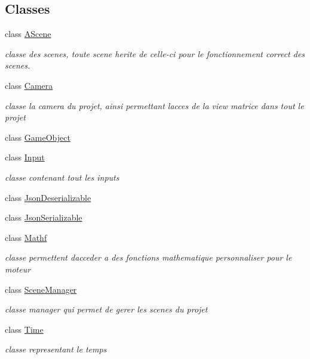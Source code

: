 \subsection*{Classes}
\begin{DoxyCompactItemize}
\item 
class \mbox{\hyperlink{class_beer_engine_1_1_a_scene}{A\+Scene}}
\begin{DoxyCompactList}\small\item\em classe des scenes, toute scene herite de celle-\/ci pour le fonctionnement correct des scenes. \end{DoxyCompactList}\item 
class \mbox{\hyperlink{class_beer_engine_1_1_camera}{Camera}}
\begin{DoxyCompactList}\small\item\em classe la camera du projet, ainsi permettant l\textquotesingle{}acces de la view matrice dans tout le projet \end{DoxyCompactList}\item 
class \mbox{\hyperlink{class_beer_engine_1_1_game_object}{Game\+Object}}
\item 
class \mbox{\hyperlink{class_beer_engine_1_1_input}{Input}}
\begin{DoxyCompactList}\small\item\em classe contenant tout les inputs \end{DoxyCompactList}\item 
class \mbox{\hyperlink{class_beer_engine_1_1_json_deserializable}{Json\+Deserializable}}
\item 
class \mbox{\hyperlink{class_beer_engine_1_1_json_serializable}{Json\+Serializable}}
\item 
class \mbox{\hyperlink{class_beer_engine_1_1_mathf}{Mathf}}
\begin{DoxyCompactList}\small\item\em classe permettent d\textquotesingle{}acceder a des fonctions mathematique personnaliser pour le moteur \end{DoxyCompactList}\item 
class \mbox{\hyperlink{class_beer_engine_1_1_scene_manager}{Scene\+Manager}}
\begin{DoxyCompactList}\small\item\em classe manager qui permet de gerer les scenes du projet \end{DoxyCompactList}\item 
class \mbox{\hyperlink{class_beer_engine_1_1_time}{Time}}
\begin{DoxyCompactList}\small\item\em classe representant le temps \end{DoxyCompactList}\item 

\end{DoxyCompactItemize}
